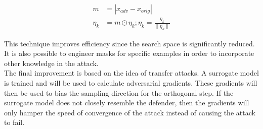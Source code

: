 \begin{align}
m &= | x_{adv} - x_{orig}| \label{eq:mask}\\
\eta_{k} &= m \odot \eta_k; \eta_k = \frac{\eta_k}{\| \eta_k \|} \label{eq:mask_app}
\end{align}

This technique improves efficiency since the search space is significantly reduced. It is also possible to engineer masks for specific examples in order to incorporate other knowledge in the attack.\\

The final improvement is based on the idea of transfer attacks. A surrogate model is trained and will be used to calculate adversarial gradients. These gradients will then be used to bias the sampling direction for the orthogonal step. If the surrogate model does not closely resemble the defender, then the gradients will only hamper the speed of convergence of the attack instead of causing the attack to fail.

